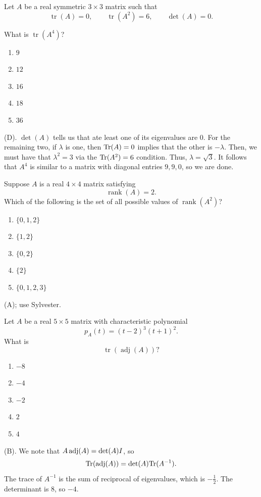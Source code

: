 \begin{exercise}
Let $A$ be a real symmetric $3\times3$ matrix
such that
\[
\operatorname{tr}(A)=0,\qquad
\operatorname{tr}(A^2)=6,\qquad
\det(A)=0.
\]

What is $\operatorname{tr}(A^4)$?

\begin{enumerate}[label=(\Alph*)]
    \item $9$
    \item $12$
    \item $16$
    \item $18$
    \item $36$
\end{enumerate}
\end{exercise}
\begin{solution}
(D). $\det(A)$ tells us that ate least one of its eigenvalues are $0$. For the remaining 
two, if $\lambda$ is one, then $\text{Tr}(A) = 0$ implies that the other is $-\lambda$. 
Then, we must have that $\lambda^2 = 3$ via the $\text{Tr}(A^2) = 6$ condition. Thus, $\lambda = \sqrt{3}$.
It follows that $A^4$ is similar to a matrix with diagonal entries $9,9,0$, so we are done.
\end{solution}

\begin{exercise}
Suppose $A$ is a real $4\times4$ matrix
satisfying
\[
\operatorname{rank}(A)=2.
\]
Which of the following is the set of all possible values of 
$\operatorname{rank}(A^2)$?
\begin{enumerate}[label=(\Alph*)]
    \item $\{0,1,2\}$
    \item $\{1,2\}$
    \item $\{0,2\}$
    \item $\{2\}$
    \item $\{0,1,2,3\}$
\end{enumerate}
\end{exercise}
\begin{solution}
(A); use Sylvester.
\end{solution}

\begin{exercise}
Let $A$ be a real $5\times5$ matrix with
characteristic polynomial
\[
p_A(t)=(t-2)^3(t+1)^2.
\]
What is
\[
\operatorname{tr}(\operatorname{adj}(A))?
\]
\begin{enumerate}[label=(\Alph*)]
    \item $-8$
    \item $-4$
    \item $-2$
    \item $2$
    \item $4$
\end{enumerate}
\end{exercise}
\begin{solution}
(B). We note that $A \operatorname{adj}(A) = \det(A) I$, so 
\[
\text{Tr}(\operatorname{adj}(A)) = \det(A) \text{Tr}(A^{-1}).
\]
The trace of $A^{-1}$ is the sum of reciprocal of eigenvalues, 
which is $-\frac{1}{2}$. The determinant is $8$, so $-4$.
\end{solution}

